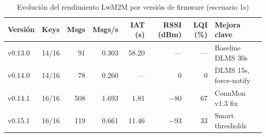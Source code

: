 
\begin{table}[htbp]
\centering
\caption{Evolución del rendimiento LwM2M por versión de firmware (escenario 1s)}
\label{tab:lwm2m-cross-version}
\begin{tabular}{lrrrrrrl}
\toprule
\textbf{Versión} & \textbf{Keys} & \textbf{Msgs} & \textbf{Msgs/s} & \textbf{IAT (s)} & \textbf{RSSI (dBm)} & \textbf{LQI (\%)} & \textbf{Mejora clave} \\
\midrule
v0.13.0 & 14/16 & 91 & 0.303 & 58.20 & --- & --- & Baseline DLMS 30s \\
v0.14.0 & 14/16 & 78 & 0.260 & --- & 0 & 0 & DLMS 15s, force-notify \\
v0.14.1 & 16/16 & 508 & 1.693 & 1.81 & $-$80 & 67 & ConnMon v1.3 fix \\
v0.15.1 & 16/16 & 119 & 0.661 & 11.46 & $-$93 & 33 & Smart thresholds \\
\bottomrule
\end{tabular}
\end{table}
